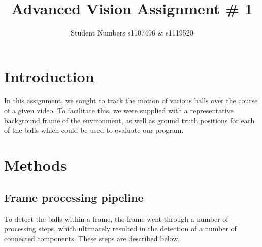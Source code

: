 \documentclass[12pt,a4paper]{article}
\begin{document}
\title{Advanced Vision Assignment \# 1}
\author{Student Numbers s1107496 \& s1119520}

\maketitle

\section{Introduction}
In this assignment, we sought to track the motion of various balls over the course of a given video. To facilitate this, we were supplied with a representative background frame of the environment, as well as ground truth positions for each of the balls which could be used to evaluate our program.

\section{Methods}

\subsection{Frame processing pipeline}
To detect the balls within a frame, the frame went through a number of processing steps, which ultimately resulted in the detection of a number of connected components. These steps are described below.
\end{document}

